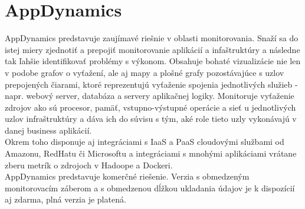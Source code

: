 \documentclass[11pt,final,oneside]{fithesis}
\begin{document}
\section{AppDynamics}
AppDynamics predstavuje zaujímavé riešnie v oblasti monitorovania. Snaží sa do istej miery zjednotiť a prepojiť monitorovanie aplikácií 
a infaštruktúry a následne tak ľahšie identifikovať problémy s výkonom. Obsahuje bohaté vizualizácie nie len v podobe grafov o vyťažení,
ale aj mapy a plošné grafy pozostávajúce s uzlov prepojených čiarami, ktoré reprezentujú vyťaženie spojenia jednotlivých služieb - 
napr. webový server, databáza a servery aplikačnej logiky. Monitoruje vyťaženie zdrojov ako sú procesor, pamäť, vstupno-výstupné operácie
a sieť u jednotlivých uzlov infraštruktúry a dáva ich do súvisu s tým, aké role tieto uzly vykonávajú v danej business aplikácií.
\\Okrem toho disponuje aj integráciami s IaaS a PaaS cloudovými službami od Amazonu, RedHatu či Microsoftu a integráciami s mnohými aplikáciami
vrátane zberu metrík o zdrojoch v Hadoope a Dockeri.\cite{17}
\\AppDynamics predstavuje komerčné riešenie. Verzia s obmedzeným monitorovacím záberom a s obmedzenou dĺžkou ukladania údajov je k 
dispozícií aj zdarma, plná verzia je platená.
\end{document}
